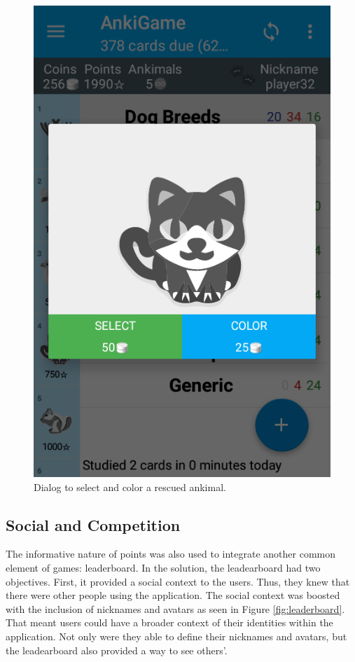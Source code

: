 \begin{figure}[htb]
    \vskip 5mm
        \begin{center}
            \includegraphics[scale=0.4]{./Figures/ankimal_selection.png}
            \caption{Dialog to select and color a rescued ankimal.}
            \label{fig:ankimals-select}
        \end{center}
    \vskip -5mm
\end{figure}

\subsection{Social and Competition}
The informative nature of points was also used to integrate another common element of games: leaderboard. In the solution, the leadearboard had two objectives. First, it provided a social context to the users. Thus, they knew that there were other people using the application. The social context was boosted with the inclusion of nicknames and avatars as seen in Figure \ref{fig:leaderboard}. That meant users could have a broader context of their identities within the application. Not only were they able to define their nicknames and avatars, but the leadearboard also provided a way to see others'.

